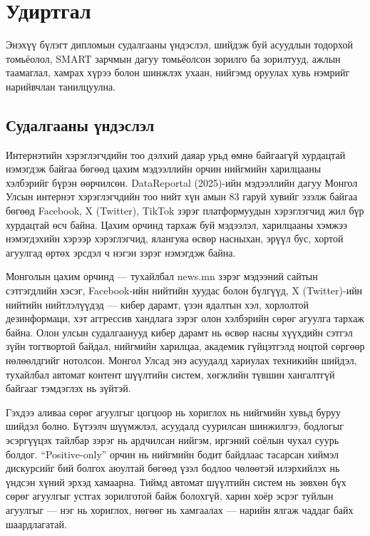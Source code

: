 
\chapter{Удиртгал}
\label{Chapter1}

Энэхүү бүлэгт дипломын судалгааны үндэслэл, шийдэж буй асуудлын тодорхой
томьёолол, SMART зарчмын дагуу томьёолсон зорилго ба зорилтууд, ажлын
таамаглал, хамрах хүрээ болон шинжлэх ухаан, нийгэмд оруулах хувь нэмрийг
нарийвчлан танилцуулна.

\section{Судалгааны үндэслэл}

Интернэтийн хэрэглэгчдийн тоо дэлхий даяар урьд өмнө байгаагүй хурдацтай
нэмэгдэж байгаа бөгөөд цахим мэдээллийн орчин нийгмийн харилцааны хэлбэрийг
бүрэн өөрчилсөн. DataReportal (2025)-ийн мэдээллийн дагуу Монгол Улсын
интернэт хэрэглэгчдийн тоо нийт хүн амын 83 гаруй хувийг эзэлж байгаа бөгөөд
Facebook, X (Twitter), TikTok зэрэг платформуудын хэрэглэгчид жил бүр хурдацтай
өсч байна. Цахим орчинд тархаж буй мэдээлэл, харилцааны хэмжээ нэмэгдэхийн
хэрээр хэрэглэгчид, ялангуяа өсвөр насныхан, эрүүл бус, хортой агуулгад
өртөх эрсдэл ч нэгэн зэрэг нэмэгдэж байна.

Монголын цахим орчинд --- тухайлбал news.mn зэрэг мэдээний сайтын сэтгэгдлийн
хэсэг, Facebook-ийн нийтийн хуудас болон бүлгүүд, X (Twitter)-ийн нийтийн
нийтлэлүүдэд --- кибер дарамт, үзэн ядалтын хэл, хорлолтой дезинформаци, хэт
аггрессив хандлага зэрэг олон хэлбэрийн сөрөг агуулга тархаж байна. Олон
улсын судалгаанууд \cite{kowalski2014,vogels2022} кибер дарамт нь өсвөр насны
хүүхдийн сэтгэл зүйн тогтвортой байдал, нийгмийн харилцаа, академик
гүйцэтгэлд ноцтой сөргөөр нөлөөлдгийг нотолсон. Монгол Улсад энэ асуудалд
хариулах техникийн шийдэл, тухайлбал автомат контент шүүлтийн систем,
хөгжлийн түвшин хангалтгүй байгааг тэмдэглэх нь зүйтэй.

Гэхдээ аливаа сөрөг агуулгыг цогцоор нь хориглох нь нийгмийн хувьд буруу
шийдэл болно. Бүтээлч шүүмжлэл, асуудалд суурилсан шинжилгээ, бодлогыг
эсэргүүцэх тайлбар зэрэг нь ардчилсан нийгэм, иргэний соёлын чухал суурь
болдог. ``Positive-only'' орчин нь нийгмийн бодит байдлаас тасарсан хиймэл
дискурсийг бий болгох аюултай бөгөөд үзэл бодлоо чөлөөтэй илэрхийлэх нь
үндсэн хүний эрхэд хамаарна. Тиймд автомат шүүлтийн систем нь зөвхөн бүх
сөрөг агуулгыг устгах зорилготой байж болохгүй, харин хоёр эсрэг туйлын
агуулгыг --- нэг нь хориглох, нөгөөг нь хамгаалах --- нарийн ялгаж чаддаг
байх шаардлагатай.

